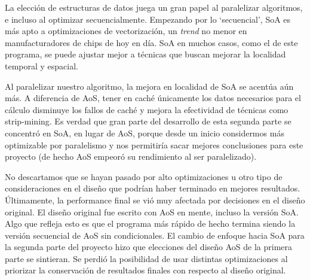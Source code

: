 \documentclass{article}
\begin{document}
La elección de estructuras de datos juega un gran papel al paralelizar algoritmos, e incluso al optimizar secuencialmente.
Empezando por lo `secuencial', SoA es más apto a optimizaciones de vectorización, un \textit{trend} no menor en manufacturadores
de chips de hoy en día. SoA en muchos casos, como el de este programa, se puede ajustar mejor a técnicas que buscan mejorar
la localidad temporal y espacial.

Al paralelizar nuestro algoritmo, la mejora en localidad de SoA se acentúa aún más. A diferencia de AoS, tener en caché únicamente
los datos necesarios para el cálculo disminuye los fallos de caché y mejora la efectividad de técnicas como strip-mining.
Es verdad que gran parte del desarrollo de esta segunda parte
se concentró en SoA, en lugar de AoS, porque desde un inicio considermos más optimizable por paralelismo y nos permitiría sacar mejores conclusiones
para este proyecto (de hecho AoS empeoró su rendimiento al ser paralelizado).

No descartamos que se hayan pasado por alto optimizaciones u otro tipo de consideraciones
en el diseño que podrían haber terminado en mejores resultados. Últimamente, la performance final se vió muy
afectada por decisiones en el diseño original. El diseño original fue escrito con AoS en mente, incluso la versión SoA.
Algo que refleja esto es que el programa más rápido de hecho termina siendo la versión secuencial de AoS sin condicionales.
El cambio de enfoque hacia SoA para la segunda parte del proyecto hizo que elecciones del diseño AoS de la primera
parte se sintieran. Se perdió la posibilidad de usar distintas optimizaciones
al priorizar la conservación de resultados finales con respecto al diseño original.

\printbibliography
\end{document}
